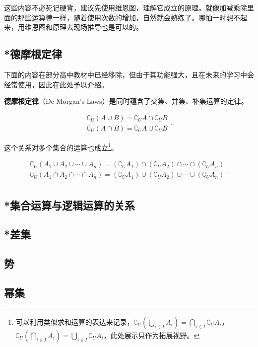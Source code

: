 这些内容不必死记硬背，建议先使用维恩图，理解它成立的原理。就像加减乘除里面的那些运算律一样，随着使用次数的增加，自然就会熟练了。哪怕一时想不起来，用维恩图和原理去现场推导也是可以的。

\subsection{*德摩根定律}

下面的内容在部分高中教材中已经移除，但由于其功能强大，且在未来的学习中会经常使用，因此在此处予以介绍。

\textbf{德摩根定律}（De Morgan’s Laws）是同时蕴含了交集、并集、补集运算的定律。

\begin{equation}
\begin{array}{c} 
 \complement_U(A \cup B) = \complement_U A \cap \complement_U B \\  
\complement_U(A \cap B) = \complement_U A \cup \complement_U B
\end{array}.~
\end{equation}

这个关系对多个集合的运算也成立\footnote{可以利用类似求和运算的表达来记录，$\displaystyle\complement_U(\bigcup_{i\in I} A_i)=\bigcap_{i\in I} {\complement_UA_i}$，$\displaystyle\complement_U(\bigcap_{i\in I} A_i)=\bigcup_{i\in I} {\complement_UA_i}$，此处展示只作为拓展视野。}。

\begin{equation}
\begin{array}{c} 
\displaystyle
\complement_U(A_1\cup A_2\cup\cdots\cup A_n)=(\complement_UA_1)\cap (\complement_UA_2)\cap\cdots\cap(\complement_UA_n)\\  
\displaystyle
\complement_U(A_1\cap A_2\cap\cdots\cap A_n)=(\complement_UA_1)\cup (\complement_UA_2)\cup\cdots\cup(\complement_UA_n)\\  
\end{array}.~
\end{equation}


\subsection{*集合运算与逻辑运算的关系}



\subsection{*差集}
\subsection{势}
\subsection{幂集}
